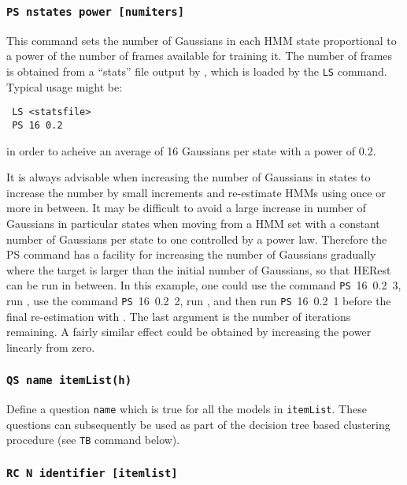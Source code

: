 \subsubsection*{\tt PS nstates power [numiters]   }

This command sets the number of Gaussians in each HMM state
proportional to a power of the number of frames available for training it.  The
number of frames is obtained from a ``stats'' file output by ,
which is loaded by the \texttt{LS} command.  Typical usage might be:
\begin{verbatim}
 LS <statsfile> 
 PS 16 0.2 
\end{verbatim}
in order to acheive an average of 16 Gaussians per state with a power
of 0.2.  

It is always advisable when increasing the number of Gaussians in states to
increase the number by small increments and re-estimate HMMs using
 once or more in between.  It may be difficult to avoid a
large increase in number of Gaussians in particular states when moving from
a HMM set with a constant number of Gaussians per state to one controlled
by a power law.  Therefore the PS command has a facility for increasing
the number of Gaussians gradually where the target is larger than the
initial number of Gaussians, so that HERest can be run in between.  In this
example, one could use the  command \texttt{PS}~16~0.2~3, run
, use the command \texttt{PS}~16~0.2~2, run ,
and then run \texttt{PS}~16~0.2~1 before the final re-estimation with
.  The last argument is the number of iterations remaining.
A fairly similar effect could be obtained by increasing the power linearly
from zero.


\subsubsection*{\tt QS name itemList(h)}

Define a question \texttt{name} which is true for all the models in
\texttt{itemList}.  These questions can subsequently be used as part 
of the decision tree based clustering procedure (see \texttt{TB}
command below).

\subsubsection*{\tt RC N identifier [itemlist]}

